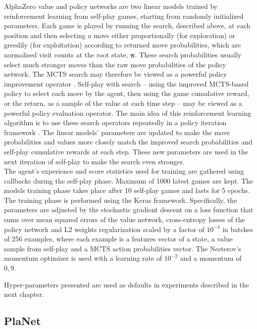 AlphaZero value and policy networks are two linear models trained by reinforcement learning from self-play games, starting from randomly initialized parameters. Each game is played by running the search, described above, at each position and then selecting a move either proportionally (for exploration) or greedily (for exploitation) according to returned move probabilities, which are normalised visit counts at the root state, $\boldsymbol\pi$. These search probabilities usually select much stronger moves than the raw move probabilities of the policy network. The MCTS search may therefore be viewed as a powerful policy improvement operator \cite{Book.RLAI}. Self-play with search – using the improved MCTS-based policy to select each move by the agent, then using the game cumulative reward, or the return, as a sample of the value at each time step – may be viewed as a powerful policy evaluation operator. The main idea of this reinforcement learning algorithm is to use these search operators repeatedly in a policy iteration framework \cite{Algo.AlphaGoZero}. The linear models' parameters are updated to make the move probabilities and values more closely match the improved search probabilities and self-play cumulative rewards at each step. These new parameters are used in the next iteration of self-play to make the search even stronger. \\
The agent's experience and score statistics used for training are gathered using callbacks during the self-play phase. Maximum of 1000 latest games are kept. The models training phase takes place after 10 self-play games and lasts for 5 epochs. The training phase is performed using the Keras \cite{Code.Keras} framework. Specifically, the parameters are adjusted by the stochastic gradient descent on a loss function that sums over mean squared errors of the value network, cross-entropy losses of the policy network and L2 weights regularization scaled by a factor of $10^{-4}$ in batches of 256 examples, where each example is a features vector of a state, a value sample from self-play and a MCTS action probabilities vector. The Nesterov's momentum optimizer \cite{Algo.Nesterov} is used with a learning rate of $10^{-2}$ and a momentum of $0,9$.

Hyper-parameters presented are used as defaults in experiments described in the next chapter.

\subsection{PlaNet}

